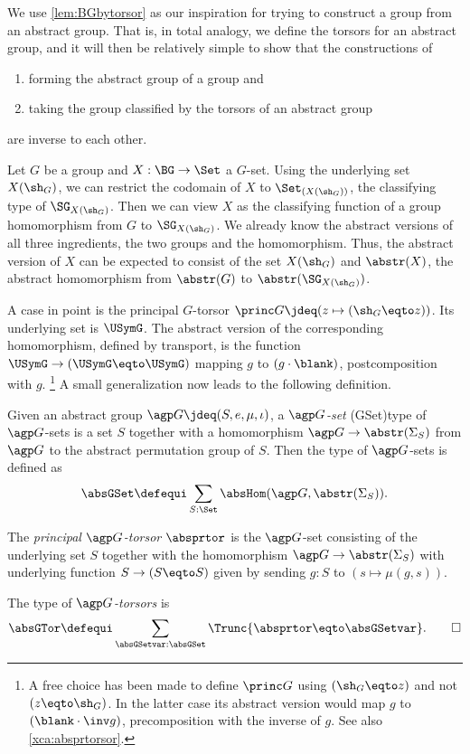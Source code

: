 We use \cref{lem:BGbytorsor} as our inspiration for trying to construct 
a group from an abstract group.
That is, in total analogy, we define the torsors for an abstract group,
and it will then be relatively simple to show that the constructions of
\begin{enumerate}
\item forming the abstract group of a group and
\item taking the group classified by the torsors of an abstract group
\end{enumerate}
 are inverse to each other.

Let $G$ be a group and $X:\BG\to\Set$ a $G$-set. Using the
underlying set $X(\sh_G)$, we can restrict the
codomain of $X$ to $\Set_{(X(\sh_G))}$, the classifying type of 
$\SG_{X(\sh_G)}$. Then we can view $X$ as the classifying function of 
a group homomorphism from $G$ to $\SG_{X(\sh_G)}$.
We already know the abstract versions of all three ingredients,
the two groups and the homomorphism. Thus, the abstract version
of $X$ can be expected to consist of the set $X(\sh_G)$ and 
$\abstr(X)$, the abstract homomorphism from $\abstr(G)$ 
to $\abstr(\SG_{X(\sh_G)})$.

A case in point is the principal $G$-torsor $\princ G \jdeq
(z\mapsto (\sh_G\eqto z))$. Its underlying set is $\USymG$.
The abstract version of the corresponding homomorphism,
defined by transport, is the function $\USymG\to(\USymG\eqto\USymG)$
mapping $g$ to $(g\cdot\blank)$, \ie postcomposition with $g$.%
\footnote{\label{ft:choicePshG}A free choice has been made to define 
$\princ G$ using $(\sh_G\eqto z)$ and not $(z\eqto\sh_G)$. In the latter
case its abstract version would map $g$ to $(\blank\cdot\inv g)$,
precomposition with the inverse of $g$. See also \cref{xca:absprtorsor}.}
A small generalization now leads to the following definition.

\begin{definition}
\label{def:abstrGtorsors}
Given an abstract group ${\agp G}\jdeq(S,e,\mu,\iota)$, a \emph{$\agp G$-set}%
\glossary(GSet){\protect{$\absGSet$}}{type of $\agp G$-sets}
is a set $S$ together with a homomorphism
$\agp G\to\abstr(\Sigma_S)$
from $\agp G$ to the abstract permutation group of $S$.
Then the type of $\agp G$-sets is defined as 
$$\absGSet\defequi \sum_{S:\Set}\absHom({\agp G},\abstr(\Sigma_{S})).$$

The \emph{principal ${\agp G}$-torsor} $\absprtor$ is the 
${\agp G}$-set consisting of the underlying set $S$ together with 
the homomorphism ${\agp G}\to\abstr(\Sigma_{S})$ with underlying 
function $S\to (S\eqto S)$ given by sending $g:S$ to $(s\mapsto \mu(g,s))$.

The type of \emph{${\agp G}$-torsors} is
\[
\absGTor\defequi\sum_{\absGSetvar:\absGSet}
  \Trunc{\absprtor \eqto \absGSetvar}.\qedhere
\]
\end{definition}


